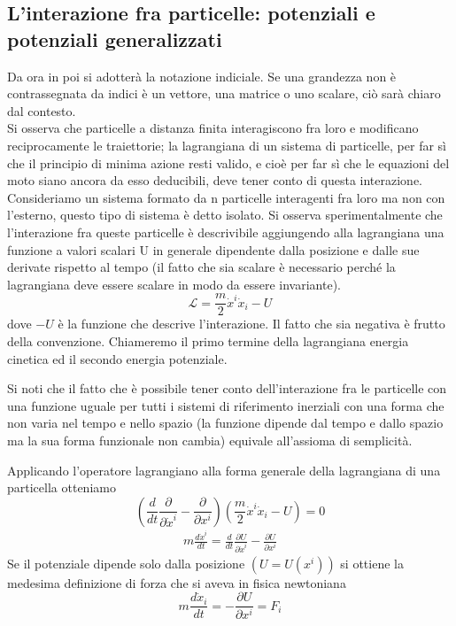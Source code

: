 \documentclass[
10pt, %
a4paper, %
oneside, %
headinclude,footinclude, %
BCOR5mm, %
]{scrartcl}
\begin{document}
\subsection{L'interazione fra particelle: potenziali e potenziali generalizzati}
Da ora in poi si adotterà la notazione indiciale. Se una grandezza non è contrassegnata da indici è un vettore, una matrice o uno scalare, ciò sarà chiaro dal contesto.\\
Si osserva che particelle a distanza finita interagiscono fra loro e modificano reciprocamente le traiettorie; la lagrangiana di un sistema di particelle, per far sì che il principio di minima azione resti valido, e cioè per far sì che le equazioni del moto siano ancora da esso deducibili, deve tener conto di questa interazione. Consideriamo un sistema formato da n particelle interagenti fra loro ma non con l'esterno, questo tipo di sistema è detto isolato. Si osserva sperimentalmente che l'interazione fra queste particelle è descrivibile aggiungendo alla lagrangiana una funzione a valori scalari U in generale dipendente dalla posizione e dalle sue derivate rispetto al tempo (il fatto che sia scalare è necessario perché la lagrangiana deve essere scalare in modo da essere invariante).
\[\mathcal{L} = \frac{m}{2}\dot{x}^i\dot{x}_i-U\]
dove \(-U\) è la funzione che descrive l'interazione. Il fatto che sia negativa è frutto della convenzione. Chiameremo il primo termine della lagrangiana energia cinetica ed il secondo energia potenziale.
\begin{osservazione}
	Si noti che il fatto che è possibile tener conto dell'interazione fra le particelle con una funzione uguale per tutti i sistemi di riferimento inerziali con una forma che non varia nel tempo e nello spazio (la funzione dipende dal tempo e dallo spazio ma la sua forma funzionale non cambia) equivale all'assioma di semplicità.
\end{osservazione}
Applicando l'operatore lagrangiano alla forma generale della lagrangiana di una particella otteniamo
\[\left(\frac{d}{dt}\frac{\partial}{\partial \dot{x}^i}-\frac{\partial}{\partial x^i}\right)\left(\frac{m}{2}\dot{x}^i\dot{x}_i-U\right) = 0\]
\begin{align}\label{eq:pot-gen}
	m\frac{d\dot{x}^i}{dt} = \frac{d}{dt}\frac{\partial U}{\partial \dot{x}^i}-\frac{\partial U}{\partial x^i}
\end{align}
Se il potenziale dipende solo dalla posizione \((U=U(x^i))\) si ottiene la medesima definizione di forza che si aveva in fisica newtoniana 
\[m\frac{d\dot{x}_i}{dt} = -\frac{\partial U}{\partial x^i}=F_i\]
\end{document}
